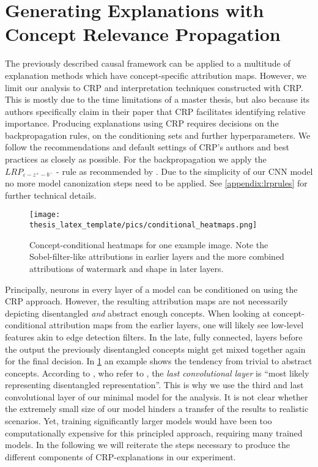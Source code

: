 \section{Generating Explanations with Concept Relevance Propagation}\label{section:explanations_with_crp}
The previously described causal framework can be applied to a multitude of explanation methods which have concept-specific attribution maps. However, we limit our analysis to CRP and interpretation techniques constructed with CRP. This is mostly due to the time limitations of a master thesis, but also because its authors specifically claim in their paper that CRP facilitates identifying relative importance. 
Producing explanations using CRP requires decisions on the backpropagation rules, on the conditioning sets and further hyperparameters. 
We follow the recommendations and default settings of CRP's authors \citep{Achtibat2022, Achtibat2023} and best practices \citep{Kohlbrenner2020} as closely as possible.
For the backpropagation we apply the $LRP_{\varepsilon -z^+- b^-}$ - rule as recommended by \cite{Kohlbrenner2020}. Due to the simplicity of our CNN model no more model canonization steps need to be applied. See \cref{appendix:lrprules} for further technical details. 

\begin{figure}[t!]
    \centering
    \texttt{[image: thesis\_latex\_template/pics/conditional\_heatmaps.png]}
    \caption[Comparing Attribution Maps of Layers]{Concept-conditional heatmaps for one example image. Note the Sobel-filter-like attributions in earlier layers and the more combined attributions of watermark and shape in later layers.}
    \label{fig:cc_heatmaps}
\end{figure}

Principally, neurons in every layer of a model can be conditioned on using the CRP approach. However, the resulting attribution maps are not necessarily depicting disentangled \textit{and} abstract enough concepts. When looking at concept-conditional attribution maps from the earlier layers, one will likely see low-level features akin to edge detection filters. In the late, fully connected, layers before the output the previously disentangled concepts might get mixed together again for the final decision. In \cref{fig:cc_heatmaps} an example shows the tendency from trivial to abstract concepts. 
According to \cite{Dreyer2023a}, who refer to \cite{Zeiler2013}, the \textit{last convolutional layer} is ``most likely representing disentangled representation''. This is why we use the third and last convolutional layer of our minimal model for the analysis. It is not clear whether the extremely small size of our model hinders a transfer of the results to realistic scenarios. Yet, training significantly larger models would have been too computationally expensive for this principled approach, requiring many trained models.
In the following we will reiterate the steps necessary to produce the different components of CRP-explanations in our experiment.

